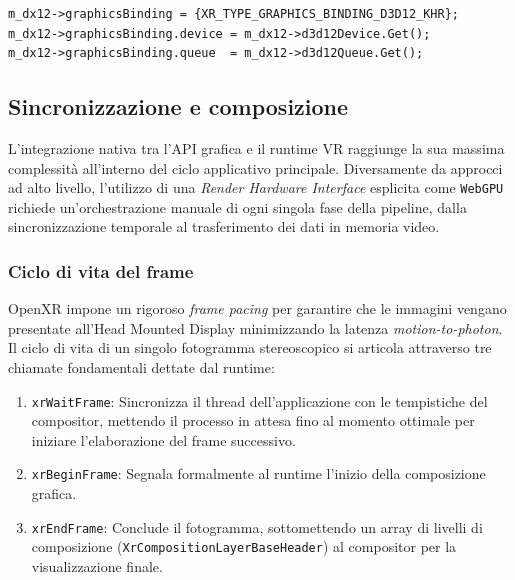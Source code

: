 \documentclass[a4paper, 11pt, twoside]{report}
\begin{document}
\begin{listing}[!ht]
\begin{verbatim}
m_dx12->graphicsBinding = {XR_TYPE_GRAPHICS_BINDING_D3D12_KHR};
m_dx12->graphicsBinding.device = m_dx12->d3d12Device.Get();
m_dx12->graphicsBinding.queue  = m_dx12->d3d12Queue.Get();
\end{verbatim}
\vspace{-0.75cm}
\caption{Assegnazione \textit{Non-Owning} di puntatori al Graphics Binding}
\label{listing:nonown}
\end{listing}

\subsection{Sincronizzazione e composizione}

L'integrazione nativa tra l'API grafica e il runtime VR raggiunge la sua massima complessità all'interno del ciclo
applicativo principale. Diversamente da approcci ad alto livello, l'utilizzo di una \textit{Render Hardware Interface}
esplicita come \texttt{WebGPU} richiede un'orchestrazione manuale di ogni singola fase della pipeline, dalla
sincronizzazione temporale al trasferimento dei dati in memoria video.

\subsubsection{Ciclo di vita del frame}

OpenXR impone un rigoroso \textit{frame pacing} per garantire che le immagini vengano presentate all'Head Mounted
Display minimizzando la latenza \textit{motion-to-photon}. Il ciclo di vita di un singolo fotogramma stereoscopico si
articola attraverso tre chiamate fondamentali dettate dal runtime:

\begin{enumerate}
    \item \texttt{xrWaitFrame}: Sincronizza il thread dell'applicazione con le tempistiche del compositor, mettendo il
        processo in attesa fino al momento ottimale per iniziare l'elaborazione del frame successivo.
    \item \texttt{xrBeginFrame}: Segnala formalmente al runtime l'inizio della composizione grafica.
    \item \texttt{xrEndFrame}: Conclude il fotogramma, sottomettendo un array di livelli di composizione 
        (\texttt{XrCompositionLayerBaseHeader}) al compositor per la visualizzazione finale.
\end{enumerate}
\end{document}
